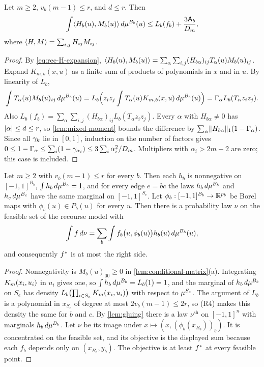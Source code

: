 \begin{lemma}\label{lem:rec-matrix-cost}
Let $m\ge2$, $v_b(m-1)\le r$, and $d\le r$. Then
\[
  \int\langle H_b(u),M_b(u)\rangle\,d\mu^{B_b}(u)\le L_b(f_b)+\frac{3\mathsf{A}_b}{D_m},
\]
where $\langle H,M\rangle=\sum_{i,j}H_{ij}M_{ij}$.
\end{lemma}

\begin{proof}
By \eqref{eq:rec-H-expansion}, $\langle H_b(u),M_b(u)\rangle=\sum_\alpha\sum_{i,j}
(H_{b\alpha})_{ij}T_\alpha(u)M_b(u)_{ij}$. Expand $K_{m,b}(x,u)$ as a finite
sum of products of polynomials in $x$ and in $u$. By linearity of $L_b$,
\[
  \int T_\alpha(u)M_b(u)_{ij}\,d\mu^{B_b}(u)
  =L_b\Bigl(z_iz_j\int T_\alpha(u)K_{m,b}(x,u)\,d\mu^{B_b}(u)\Bigr)
  =\Gamma_\alpha L_b(T_\alpha z_iz_j).
\]
Also $L_b(f_b)=\sum_\alpha\sum_{i,j}(H_{b\alpha})_{ij}L_b(T_\alpha z_iz_j)$. Every
$\alpha$ with $H_{b\alpha}\ne0$ has $\lvert \alpha\rvert\le d\le r$, so
\cref{lem:mixed-moment} bounds the difference by
$\sum_\alpha\lVert H_{b\alpha}\rVert_1(1-\Gamma_\alpha)$. Since all $\gamma_k$ lie in
$[0,1]$, induction on the number of factors gives
$0\le1-\Gamma_\alpha\le\sum_i(1-\gamma_{\alpha_i})\le3\sum_i\alpha_i^2/D_m$.
Multipliers with $\alpha_i>2m-2$ are zero; this case is included.
\end{proof}

\begin{lemma}\label{lem:rec-glue}
Let $m\ge2$ with $v_b(m-1)\le r$ for every $b$. Then each $h_b$ is
nonnegative on $[-1,1]^{B_b}$, $\int h_b\,d\mu^{B_b}=1$, and for every edge
$e=bc$ the laws $h_b\,d\mu^{B_b}$ and $h_c\,d\mu^{B_c}$ have the same
marginal on $[-1,1]^{S_e}$. Let $\phi_b:[-1,1]^{B_b}\to\mathbb{R}^{p_b}$ be Borel maps
with $\phi_b(u)\in P_b(u)$ for every $u$. Then there is a probability law
$\nu$ on the feasible set of the recourse model with
\[
  \int f\,d\nu=\sum_b\int f_b\bigl(u,\phi_b(u)\bigr)h_b(u)\,d\mu^{B_b}(u),
\]
and consequently $f^{*}$ is at most the right side.
\end{lemma}

\begin{proof}
Nonnegativity is $M_b(u)_{00}\ge0$ in \cref{lem:conditional-matrix}(a).
Integrating $K_m(x_i,u_i)$ in $u_i$ gives one, so
$\int h_b\,d\mu^{B_b}=L_b(1)=1$, and the marginal of $h_b\,d\mu^{B_b}$ on
$S_e$ has density $L_b\bigl(\prod_{i\in S_e}K_m(x_i,u_i)\bigr)$ with respect to
$\mu^{S_e}$. The argument of $L_b$ is a polynomial in $x_{S_e}$ of degree at
most $2v_b(m-1)\le2r$, so (R4) makes this density the same for $b$ and $c$.
By \cref{lem:gluing} there is a law $\nu^{\mathrm{sh}}$ on $[-1,1]^n$ with
marginals $h_b\,d\mu^{B_b}$. Let $\nu$ be its image under
$x\mapsto(x,(\phi_b(x_{B_b}))_b)$. It is concentrated on the feasible set,
and its objective is the displayed sum because each $f_b$ depends only on
$(x_{B_b},y_b)$. The objective is at least $f^{*}$ at every feasible
point.
\end{proof}

